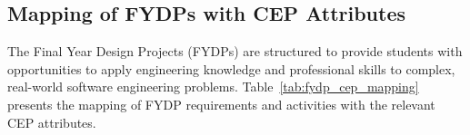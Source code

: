 \subsection{Mapping of FYDPs with CEP Attributes}
\label{sec:fydpcep}
The Final Year Design Projects (FYDPs) are structured to provide students with opportunities to apply engineering knowledge and professional skills to complex, real-world software engineering problems. Table~\ref{tab:fydp_cep_mapping} presents the mapping of FYDP requirements and activities with the relevant CEP attributes.

